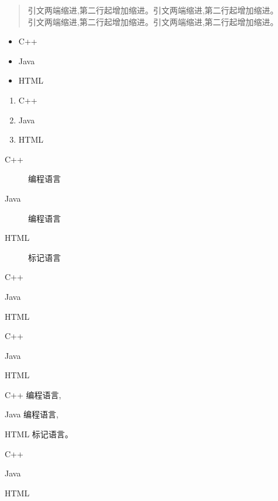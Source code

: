 \documentclass{article}
\begin{document}
\begin{verse}
引文两端缩进,第二行起增加缩进。引文两端缩进,第二行起增加缩进。\\
引文两端缩进,第二行起增加缩进。引文两端缩进,第二行起增加缩进。 \\
\end{verse}

\begin{itemize} 
\item C++
\item Java
\item HTML 
\end{itemize}

\begin{enumerate} 
\item C++
\item Java
\item HTML 
\end{enumerate}

\begin{description}
\item[C++] 编程语言
\item[Java] 编程语言
\item[HTML] 标记语言 
\end{description}

\begin{compactitem} 
\item C++
\item Java
\item HTML 
\end{compactitem}

\begin{compactenum} 
\item C++
\item Java
\item HTML 
\end{compactenum}

\begin{compactdesc}
\item[C++] 编程语言,
\item[Java] 编程语言,
\item[HTML] 标记语言。 
\end{compactdesc}

\begin{inparaitem} 
\item C++
\item Java
\item HTML 
\end{inparaitem}
\end{document}
